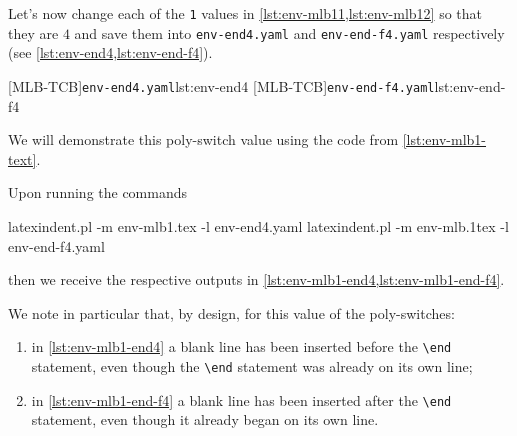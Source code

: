   \begin{example}
  Let's now change each of the \texttt{1} values in \cref{lst:env-mlb11,lst:env-mlb12} so
  that they are $4$ and save them into \texttt{env-end4.yaml} and
  \texttt{env-end-f4.yaml} respectively (see \cref{lst:env-end4,lst:env-end-f4}).

  \begin{cmhtcbraster}
   [MLB-TCB]{\texttt{env-end4.yaml}}{lst:env-end4}
   [MLB-TCB]{\texttt{env-end-f4.yaml}}{lst:env-end-f4}
  \end{cmhtcbraster}

  We will demonstrate this poly-switch value using the code from
  \vref{lst:env-mlb1-text}.

  Upon running the commands  

  \begin{commandshell}
latexindent.pl -m env-mlb1.tex -l env-end4.yaml
latexindent.pl -m env-mlb.1tex -l env-end-f4.yaml
\end{commandshell}

  then we receive the respective outputs in \cref{lst:env-mlb1-end4,lst:env-mlb1-end-f4}.

  \begin{cmhtcbraster}[raster column skip=.1\linewidth]
  \end{cmhtcbraster}

  We note in particular that, by design, for this value of the poly-switches:
  \begin{enumerate}
   \item in \cref{lst:env-mlb1-end4} a blank line has been inserted before the
         \lstinline!\end! statement, even though the \lstinline!\end! statement was
         already on its own line;
   \item in \cref{lst:env-mlb1-end-f4} a blank line has been inserted after the
         \lstinline!\end! statement, even though it already began on its own line.
  \end{enumerate}
  \end{example}

